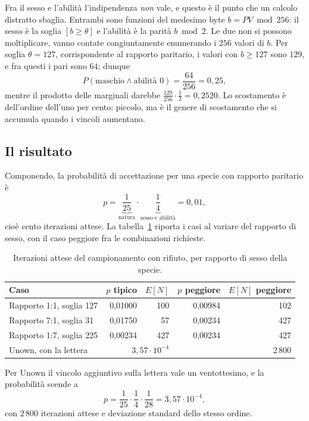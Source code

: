 Fra il sesso e l'abilità l'indipendenza \emph{non} vale, e questo è il punto che un calcolo distratto sbaglia. Entrambi sono funzioni del medesimo byte $b = PV \bmod 256$: il sesso è la soglia $[b \ge \theta]$ e l'abilità è la parità $b \bmod 2$. Le due non si possono moltiplicare, vanno contate congiuntamente enumerando i $256$ valori di $b$. Per soglia $\theta = 127$, corrispondente al rapporto paritario, i valori con $b \ge 127$ sono $129$, e fra questi i pari sono $64$; dunque
\[
P(\text{maschio} \wedge \text{abilità } 0) = \frac{64}{256} = 0{,}25,
\]
mentre il prodotto delle marginali darebbe $\frac{129}{256} \cdot \frac{1}{2} = 0{,}2520$. Lo scostamento è dell'ordine dell'uno per cento: piccolo, ma è il genere di scostamento che si accumula quando i vincoli aumentano.

\subsection{Il risultato}

Componendo, la probabilità di accettazione per una specie con rapporto paritario è
\[
p = \underbrace{\frac{1}{25}}_{\text{natura}} \cdot \underbrace{\frac{1}{4}}_{\text{sesso e abilità}} = 0{,}01,
\]
cioè cento iterazioni attese. La tabella~\ref{tab:rifiuto} riporta i casi al variare del rapporto di sesso, con il caso peggiore fra le combinazioni richieste.

\begin{table}[htbp]
\centering
\caption{Iterazioni attese del campionamento con rifiuto, per rapporto di sesso della specie.}\label{tab:rifiuto}
\begin{tabular}{@{}lrrrr@{}}
\toprule
Caso & $p$ tipico & $E[N]$ & $p$ peggiore & $E[N]$ peggiore \\
\midrule
Rapporto 1:1, soglia 127 & 0,01000 & 100 & 0,00984 & 102 \\
Rapporto 7:1, soglia 31 & 0,01750 & 57 & 0,00234 & 427 \\
Rapporto 1:7, soglia 225 & 0,00234 & 427 & 0,00234 & 427 \\
Unown, con la lettera & \multicolumn{2}{r}{$3{,}57 \cdot 10^{-4}$} & \multicolumn{2}{r}{2\,800} \\
\bottomrule
\end{tabular}
\end{table}

Per Unown il vincolo aggiuntivo sulla lettera vale un ventottesimo, e la probabilità scende a
\[
p = \frac{1}{25} \cdot \frac{1}{4} \cdot \frac{1}{28} = 3{,}57 \cdot 10^{-4},
\]
con $2\,800$ iterazioni attese e deviazione standard dello stesso ordine.

